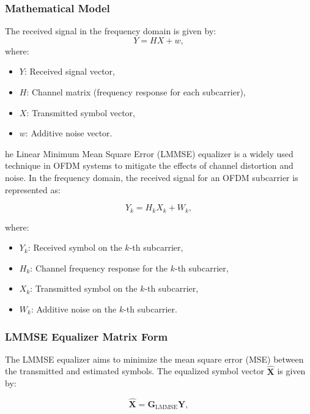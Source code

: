 \subsubsection{Mathematical Model}
The received signal in the frequency domain is given by:
\begin{equation}
Y = HX + w,
\end{equation}
where:
\begin{itemize}
    \item \( Y \): Received signal vector,
    \item \( H \): Channel matrix (frequency response for each subcarrier),
    \item \( X \): Transmitted symbol vector,
    \item \( w \): Additive noise vector.
\end{itemize}

he Linear Minimum Mean Square Error (LMMSE) equalizer is a widely used technique in OFDM systems to mitigate the effects of channel distortion and noise. In the frequency domain, the received signal for an OFDM subcarrier is represented as:

\begin{equation}
Y_k = H_k X_k + W_k,
\label{eq:ofdm_model}
\end{equation}

where:
\begin{itemize}
    \item \( Y_k \): Received symbol on the \( k \)-th subcarrier,
    \item \( H_k \): Channel frequency response for the \( k \)-th subcarrier,
    \item \( X_k \): Transmitted symbol on the \( k \)-th subcarrier,
    \item \( W_k \): Additive noise on the \( k \)-th subcarrier.
\end{itemize}

\subsubsection{LMMSE Equalizer Matrix Form}
The LMMSE equalizer aims to minimize the mean square error (MSE) between the transmitted and estimated symbols. The equalized symbol vector \( \hat{\mathbf{X}} \) is given by:

\begin{equation}
\hat{\mathbf{X}} = \mathbf{G}_{\text{LMMSE}} \mathbf{Y},
\label{eq:lmmse_estimation}
\end{equation}


